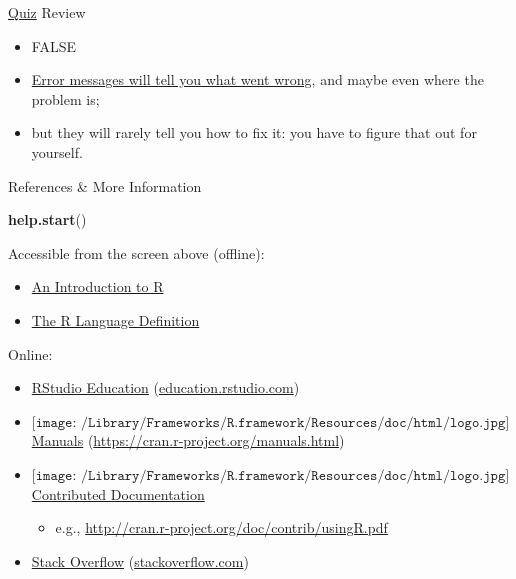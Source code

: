 \documentclass[
  11pt,
  ignorenonframetext,
]{beamer}
\newenvironment{Shaded}{\begin{snugshade}}{\end{snugshade}}
\newcommand{\FunctionTok}[1]{\textcolor[rgb]{0.13,0.29,0.53}{\textbf{#1}}}
\newcommand{\NormalTok}[1]{#1}
\providecommand{\tightlist}{%
  \setlength{\itemsep}{0pt}\setlength{\parskip}{0pt}}
\begin{document}
\begin{frame}[fragile]{\protect\hyperlink{pop-quiz}{Quiz} Review}
{\begin{itemize}
  \begin{itemize}
  \tightlist
  \item
    FALSE
  \item
    \protect\hyperlink{errors}{Error messages will tell you what went
    wrong}, and maybe even where the problem is;
  \item
    but they will rarely tell you how to fix it: you have to figure that
    out for yourself.
  \end{itemize}
\end{itemize}}
\end{frame}

\begin{frame}{References \& More Information}
\protect\hypertarget{references-more-information}{}
\begin{Shaded}
\begin{Highlighting}[]
\FunctionTok{help.start}\NormalTok{()}
\end{Highlighting}
\end{Shaded}

Accessible from the screen above (offline):

\begin{itemize}
\tightlist
\item
  \href{https://cran.r-project.org/doc/manuals/r-release/R-intro.html}{An
  Introduction to R}
\item
  \href{https://cran.r-project.org/doc/manuals/r-release/R-lang.html}{The
  R Language Definition}
\end{itemize}

Online:

\begin{itemize}
\tightlist
\item
  \href{https://education.rstudio.com/}{RStudio Education}
  (\href{https://education.rstudio.com/}{education.rstudio.com})
\item
  \(\texttt{[image: /Library/Frameworks/R.framework/Resources/doc/html/logo.jpg]}\)
  \href{https://cran.r-project.org/manuals.html}{Manuals}
  (\url{https://cran.r-project.org/manuals.html})
\item
  \(\texttt{[image: /Library/Frameworks/R.framework/Resources/doc/html/logo.jpg]}\)
  \href{https://cran.r-project.org/other-docs.html}{Contributed
  Documentation}

  \begin{itemize}
  \tightlist
  \item
    e.g., \url{http://cran.r-project.org/doc/contrib/usingR.pdf}
  \end{itemize}
\item
  \href{https://stackoverflow.com/questions/tagged/r}{Stack Overflow}
  (\href{https://stackoverflow.com/}{stackoverflow.com})
\end{itemize}


\end{frame}
\end{document}
